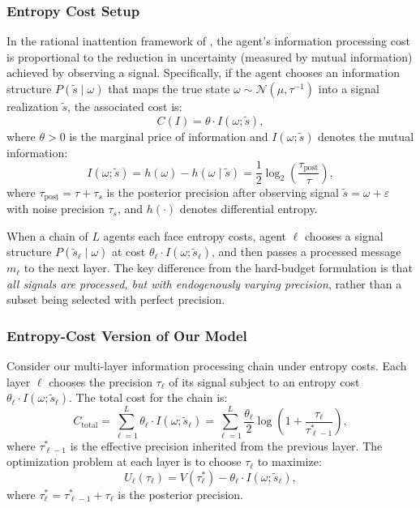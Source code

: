 \subsubsection{Entropy Cost Setup}

In the rational inattention framework of \citet{sims2003implications}, the agent's information processing cost is proportional to the reduction in uncertainty (measured by mutual information) achieved by observing a signal. Specifically, if the agent chooses an information structure $P(\tilde{s} \mid \omega)$ that maps the true state $\omega \sim \mathcal{N}(\mu, \tau^{-1})$ into a signal realization $\tilde{s}$, the associated cost is:
\begin{equation}
C(I) = \theta \cdot I(\omega; \tilde{s}),
\end{equation}
where $\theta > 0$ is the marginal price of information and $I(\omega; \tilde{s})$ denotes the mutual information:
\begin{equation}
I(\omega; \tilde{s}) = h(\omega) - h(\omega \mid \tilde{s}) = \frac{1}{2}\log_2\left(\frac{\tau_{\text{post}}}{\tau}\right),
\end{equation}
where $\tau_{\text{post}} = \tau + \tau_s$ is the posterior precision after observing signal $\tilde{s} = \omega + \varepsilon$ with noise precision $\tau_s$, and $h(\cdot)$ denotes differential entropy.

When a chain of $L$ agents each face entropy costs, agent $\ell$ chooses a signal structure $P(\tilde{s}_\ell \mid \omega)$ at cost $\theta_\ell \cdot I(\omega; \tilde{s}_\ell)$, and then passes a processed message $m_\ell$ to the next layer. The key difference from the hard-budget formulation is that \emph{all signals are processed, but with endogenously varying precision}, rather than a subset being selected with perfect precision.

\subsubsection{Entropy-Cost Version of Our Model}

Consider our multi-layer information processing chain under entropy costs. Each layer $\ell$ chooses the precision $\tau_\ell$ of its signal subject to an entropy cost $\theta_\ell \cdot I(\omega; \tilde{s}_\ell)$. The total cost for the chain is:
\begin{equation}
C_{\text{total}} = \sum_{\ell=1}^{L} \theta_\ell \cdot I(\omega; \tilde{s}_\ell) = \sum_{\ell=1}^{L} \frac{\theta_\ell}{2} \log\left(1 + \frac{\tau_\ell}{\tau_{\ell-1}^{*}}\right),
\end{equation}
where $\tau_{\ell-1}^{*}$ is the effective precision inherited from the previous layer. The optimization problem at each layer is to choose $\tau_\ell$ to maximize:
\begin{equation}
U_\ell(\tau_\ell) = V(\tau_\ell^{*}) - \theta_\ell \cdot I(\omega; \tilde{s}_\ell),
\end{equation}
where $\tau_\ell^{*} = \tau_{\ell-1}^{*} + \tau_\ell$ is the posterior precision.


